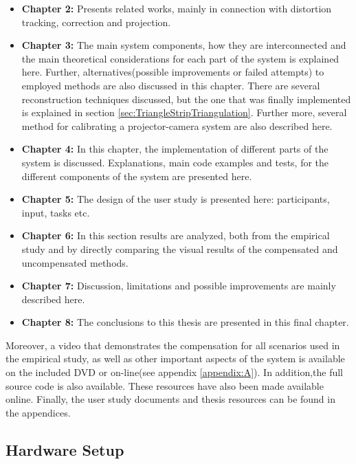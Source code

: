 \documentclass[]{article}
\begin{document}
\begin{itemize}
\item \textbf{Chapter 2:} Presents related works, mainly in connection with distortion tracking, correction and projection.
\item \textbf{Chapter 3:} The main system components, how they are interconnected and the main theoretical considerations for each part of the system is explained here. Further, alternatives(possible improvements or failed attempts) to employed methods are also discussed in this chapter. There are several reconstruction techniques discussed, but the one that was finally implemented is explained in section \ref{sec:TriangleStripTriangulation}. Further more, several method for calibrating a projector-camera system are also described here. 
\item \textbf{Chapter 4:} In this chapter, the implementation of different parts of the system is discussed. Explanations, main code examples and tests, for the different components of the system are presented here.
\item \textbf{Chapter 5:} The design of the user study is presented here: participants, input, tasks etc.
\item \textbf{Chapter 6:} In this section results are analyzed, both from the empirical study and by directly comparing the visual results of the compensated and uncompensated methods.
\item \textbf{Chapter 7:} Discussion, limitations and possible improvements are mainly described here.
\item \textbf{Chapter 8:} The conclusions to this thesis are presented in this final chapter.
\end{itemize}

Moreover, a video that demonstrates the compensation for all scenarios used in the empirical study, as well as other important aspects of the system is available on the included DVD or on-line(see appendix \ref{appendix:A}). In addition,the full source code is also available. These resources have also been made available online. Finally, the user study documents and thesis resources can be found in the appendices.

\subsection{Hardware Setup}
\end{document}
